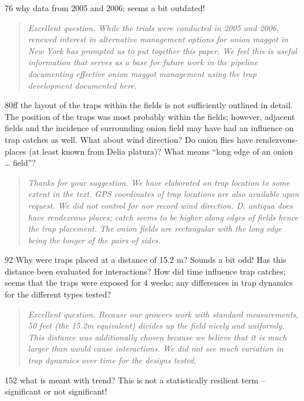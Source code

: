 \documentclass{article}
\begin{document}
76 why data from 2005 and 2006; seems a bit outdated!

\begin{quote}
    \textit{Excellent question.  While the trials were conducted in 2005 and 2006, renewed interest in alternative management options for onion maggot in New York has prompted us to put together this paper. We feel this is useful information that serves as a base for future work in the pipeline documenting effective onion maggot management using the trap development documented here.  }
\end{quote}

80ff the layout of the traps within the fields is not sufficiently outlined in detail. The position of the traps was most probably within the fields; however, adjacent fields and the incidence of surrounding onion field may have had an influence on trap catches as well. What about wind direction? Do onion flies have rendezvous-places (at least known from Delia platura)?  What means “long edge of an onion … field”?  
\begin{quote}
    \textit{Thanks for your suggestion.  We have elaborated on trap location to some extent in the text.  GPS coordinates of trap locations are also available upon request.  We did not control for nor record wind direction.  \textit{D. antiqua} does have rendezvous places; catch seems to be higher along edges of fields hence the trap placement.  The onion fields are rectangular with the long edge being the longer of the pairs of sides.  }
\end{quote}


92 Why were traps placed at a distance of 15.2 m? Sounds a bit odd! Has this distance been evaluated for interactions? How did time influence trap catches; seems that the traps were exposed for 4 weeks; any differences in trap dynamics for the different types tested? 

\begin{quote}
    \textit{Excellent question.  Because our growers work with standard measurements, 50 feet (the 15.2m equivalent) divides up the field nicely and uniformly.  This distance was additionally chosen because we believe that it is much larger than would cause interactions.  We did not see much variation in trap dynamics over time for the designs tested.  
    }
\end{quote}


152 what is meant with trend? This is not a statistically resilient term – significant or not significant!
\end{document}
